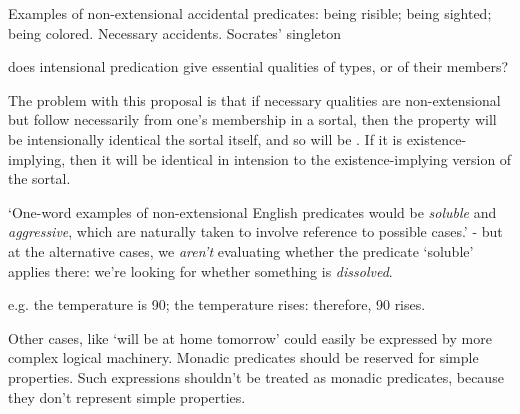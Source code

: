 \documentclass[]{article}
\begin{document}
Examples of non-extensional accidental predicates: being risible; being sighted; being colored. Necessary accidents. Socrates' singleton

does intensional predication give essential qualities of types, or of their members?

The problem with this proposal is that if necessary qualities are non-extensional but follow necessarily from one's membership in a sortal, then the property will be intensionally identical the sortal itself, and so will be . If it is existence-implying, then it will be identical in intension to the existence-implying version of the sortal.

`One-word examples of non-extensional English predicates would be \textit{soluble} and \textit{aggressive}, which are naturally taken to involve reference to possible cases.' - but at the alternative cases, we \textit{aren't} evaluating whether the predicate `soluble' applies there: we're looking for whether something is \textit{dissolved}.

e.g. the temperature is 90; the temperature rises: therefore, 90 rises.

Other cases, like `will be at home tomorrow' could easily be expressed by more complex logical machinery. Monadic predicates should be reserved for simple properties. Such expressions shouldn't be treated as monadic predicates, because they don't represent simple properties.
\end{document}
